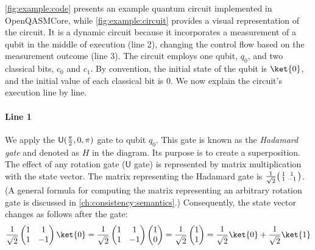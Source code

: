 \cref{fig:example:code} presents an example quantum circuit implemented in
OpenQASMCore, while \cref{fig:example:circuit} provides a visual representation
of the circuit.
%
It is a dynamic circuit because it incorporates a measurement of a qubit in the
middle of execution (line 2), changing the control flow based on the
measurement outcome (line 3).
%
The circuit employs one qubit, $q_0$, and two classical bits, $c_0$ and $c_1$.
%
By convention, the initial state of the qubit is $\ket{0}$, and the initial
value of each classical bit is $0$.
%
We now explain the circuit's execution line by line.

\paragraph{Line 1}

We apply the $\mathsf{U}(\frac{\pi}{2},0,\pi)$ gate to qubit $q_0$.
%
This gate is known as the \emph{Hadamard gate} and denoted as $H$ in the
diagram.
%
Its purpose is to create a superposition.
%
The effect of any rotation gate ($\mathsf{U}$ gate) is represented by matrix
multiplication with the state vector.
%
The matrix representing the Hadamard gate is
$\frac{1}{\sqrt{2}}\big(\begin{smallmatrix}1&1\\1&-1\end{smallmatrix}\big)$.
%
(A general formula for computing the matrix representing an arbitrary rotation
gate is discussed in \cref{ch:consistency:semantics}.)
%
Consequently, the state vector changes as follows after the gate:
%
\[
	\frac{1}{\sqrt{2}}\mtrx{1&1\\1&-1}\ket{0}
	=\frac{1}{\sqrt{2}}\mtrx{1&1\\1&-1}\mtrx{1\\0}
	=\frac{1}{\sqrt{2}}\mtrx{1\\1}
	=\frac{1}{\sqrt{2}}\ket{0}+\frac{1}{\sqrt{2}}\ket{1}
\]

